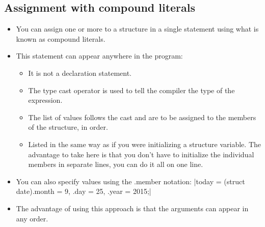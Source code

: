 \subsection{Assignment with compound literals}
\begin{itemize}
    \item You can assign one or more to a structure in a single statement using what is known as compound literals. %

    \item This statement can appear anywhere in the program:
        \begin{itemize}
            \item It is not a declaration statement.
            \item The type cast operator is used to tell the compiler the type of the expression. 
            \item The list of values follows the cast and are to be assigned to the members of the structure, in order. 
            \item Listed in the same way as if you were initializing a structure variable. The advantage to take here is that you don't have to initialize the individual members in separate lines, you can do it all on one line.
        \end{itemize}
    
    \item You can also specify values using the .member notation:
        |today = (struct date){.month = 9, .day = 25, .year = 2015};|
    
    \item The advantage of using this approach is that the arguments can appear in any order. 
\end{itemize}


